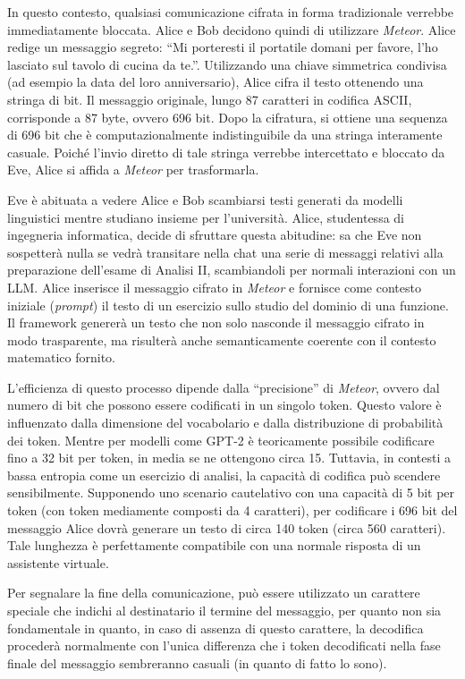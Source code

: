 In questo contesto, qualsiasi comunicazione cifrata in forma tradizionale verrebbe immediatamente bloccata. Alice e Bob decidono quindi di utilizzare \emph{Meteor}. Alice redige un messaggio segreto: \enquote{Mi porteresti il portatile domani per favore, l'ho lasciato sul tavolo di cucina da te.}. Utilizzando una chiave simmetrica condivisa (ad esempio la data del loro anniversario), Alice cifra il testo ottenendo una stringa di bit. Il messaggio originale, lungo 87 caratteri in codifica ASCII, corrisponde a 87 byte, ovvero 696 bit. Dopo la cifratura, si ottiene una sequenza di 696 bit che è computazionalmente indistinguibile da una stringa interamente casuale. Poiché l'invio diretto di tale stringa verrebbe intercettato e bloccato da Eve, Alice si affida a \emph{Meteor} per trasformarla.

Eve è abituata a vedere Alice e Bob scambiarsi testi generati da modelli linguistici mentre studiano insieme per l'università. Alice, studentessa di ingegneria informatica, decide di sfruttare questa abitudine: sa che Eve non sospetterà nulla se vedrà transitare nella chat una serie di messaggi relativi alla preparazione dell'esame di Analisi II, scambiandoli per normali interazioni con un LLM. Alice inserisce il messaggio cifrato in \emph{Meteor} e fornisce come contesto iniziale (\emph{prompt}) il testo di un esercizio sullo studio del dominio di una funzione. Il framework genererà un testo che non solo nasconde il messaggio cifrato in modo trasparente, ma risulterà anche semanticamente coerente con il contesto matematico fornito.

L'efficienza di questo processo dipende dalla \enquote{precisione} di \emph{Meteor}, ovvero dal numero di bit che possono essere codificati in un singolo token. Questo valore è influenzato dalla dimensione del vocabolario e dalla distribuzione di probabilità dei token. Mentre per modelli come GPT-2 è teoricamente possibile codificare fino a 32 bit per token, in media se ne ottengono circa 15. Tuttavia, in contesti a bassa entropia come un esercizio di analisi, la capacità di codifica può scendere sensibilmente. Supponendo uno scenario cautelativo con una capacità di 5 bit per token (con token mediamente composti da 4 caratteri), per codificare i 696 bit del messaggio Alice dovrà generare un testo di circa 140 token (circa 560 caratteri). Tale lunghezza è perfettamente compatibile con una normale risposta di un assistente virtuale.

Per segnalare la fine della comunicazione, può essere utilizzato un carattere speciale che indichi al destinatario il termine del messaggio, per quanto non sia fondamentale in quanto, in caso di assenza di questo carattere, la decodifica procederà normalmente con l'unica differenza che i token decodificati nella fase finale del messaggio sembreranno casuali (in quanto di fatto lo sono).

